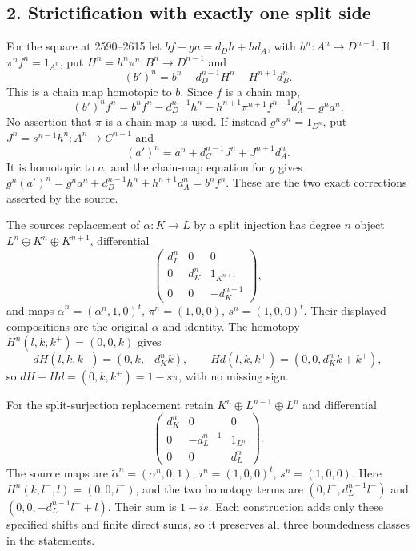 \documentclass[11pt]{article}
\begin{document}
\subsection{2. Strictification with exactly one split side}\label{proofs-2419-2994-strictification-with-exactly-one-split-side}

For the square at 2590–\allowbreak{}2615 let \(bf-ga=d_Dh+hd_A\),\allowbreak{} with \(h^n:A^n\to D^{n-1}\). If \(\pi^nf^n=1_{A^n}\),\allowbreak{} put \(H^n=h^n\pi^n:B^n\to D^{n-1}\) and \[
(b')^n=b^n-d_D^{n-1}H^n-H^{n+1}d_B^n.
\] This is a chain map homotopic to \(b\). Since \(f\) is a chain map,\allowbreak{} \[
(b')^nf^n=b^nf^n-d_D^{n-1}h^n
-h^{n+1}\pi^{n+1}f^{n+1}d_A^n=g^na^n.
\] No assertion that \(\pi\) is a chain map is used. If instead \(g^ns^n=1_{D^n}\),\allowbreak{} put \(J^n=s^{n-1}h^n:A^n\to C^{n-1}\) and \[
(a')^n=a^n+d_C^{n-1}J^n+J^{n+1}d_A^n.
\] It is homotopic to \(a\),\allowbreak{} and the chain-map equation for \(g\) gives \(g^n(a')^n=g^na^n+d_D^{n-1}h^n+h^{n+1}d_A^n=b^nf^n\). These are the two exact corrections asserted by the source.

The source\textquotesingle s replacement of \(\alpha:K\to L\) by a split injection has degree \(n\) object \(L^n\oplus K^n\oplus K^{n+1}\),\allowbreak{} differential \[
\begin{pmatrix}d_L^n&0&0\\0&d_K^n&1_{K^{n+1}}\\
0&0&-d_K^{n+1}\end{pmatrix},
\] and maps \(\widetilde\alpha^n=(\alpha^n,1,0)^t\),\allowbreak{} \(\pi^n=(1,0,0)\),\allowbreak{} \(s^n=(1,0,0)^t\). Their displayed compositions are the original \(\alpha\) and identity. The homotopy \(H^n(l,k,k^+)=(0,0,k)\) gives \[
dH(l,k,k^+)=(0,k,-d_K^nk),\qquad
Hd(l,k,k^+)=(0,0,d_K^nk+k^+),
\] so \(dH+Hd=(0,k,k^+)=1-s\pi\),\allowbreak{} with no missing sign.

For the split-surjection replacement retain \(K^n\oplus L^{n-1}\oplus L^n\) and differential \[
\begin{pmatrix}d_K^n&0&0\\0&-d_L^{n-1}&1_{L^n}\\
0&0&d_L^n\end{pmatrix}.
\] The source maps are \(\widetilde\alpha^n=(\alpha^n,0,1)\),\allowbreak{} \(i^n=(1,0,0)^t\),\allowbreak{} \(s^n=(1,0,0)\). Here \(H^n(k,l^-,l)=(0,0,l^-)\),\allowbreak{} and the two homotopy terms are \((0,l^-,d_L^{n-1}l^-)\) and \((0,0,-d_L^{n-1}l^-+l)\). Their sum is \(1-is\). Each construction adds only these specified shifts and finite direct sums,\allowbreak{} so it preserves all three boundedness classes in the statements.
\end{document}
